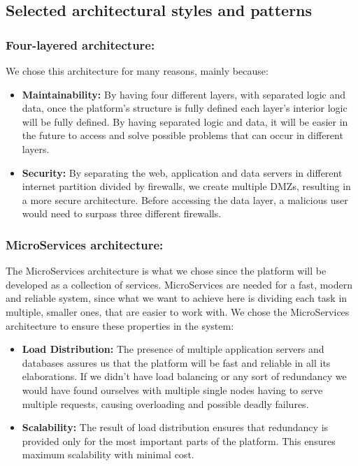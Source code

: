 \documentclass{article}
\begin{document}
{\subsection{Selected architectural styles and patterns}
    \subsubsection{Four-layered architecture:} We chose this architecture for many reasons, mainly because:
    \begin{itemize}
        \item \textbf{Maintainability:} By having four different layers, with separated logic and data, once the platform's structure is fully defined
        each layer's interior logic will be fully defined.
        By having separated logic and data, it will be easier in the future to access and solve possible problems that can occur in different 
        layers.
        \item \textbf{Security:} By separating the web, application and data servers in different internet partition divided by firewalls, we create multiple
        DMZs, resulting in a more secure architecture. Before accessing the data layer, a malicious user would need to surpass three different firewalls. 
    \end{itemize}
    \subsubsection{MicroServices architecture:} The MicroServices architecture is what we chose since the platform will be developed as a collection of 
    services. MicroServices are needed for a fast, modern and reliable system, since what we want to achieve here is dividing each task in multiple, 
    smaller ones, that are easier to work with.
    We chose the MicroServices architecture to ensure these properties in the system:
    \begin{itemize}
        \item \textbf{Load Distribution:} The presence of multiple application servers and databases assures us that the platform will be fast 
        and reliable in all its elaborations. If we didn't have load balancing or any sort of redundancy we would have found ourselves with multiple
        single nodes having to serve multiple requests, causing overloading and possible deadly failures.
        \item \textbf{Scalability:} The result of load distribution ensures that redundancy is provided only for the most important parts of the platform.
        This ensures maximum scalability with minimal cost.
    \end{itemize}
}
\end{document}
